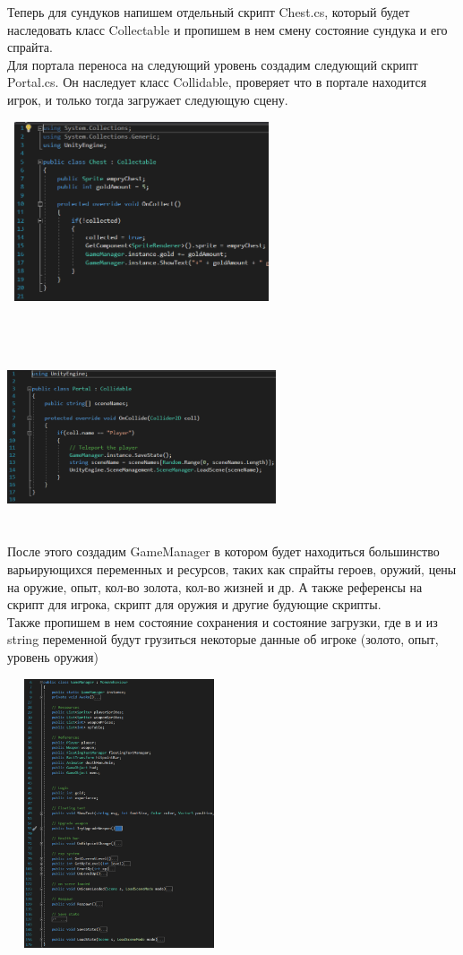\documentclass[a4paper,12pt]{article}
\begin{document}
Теперь для сундуков напишем отдельный скрипт Chest.cs, который будет наследовать класс Collectable и пропишем в нем смену состояние сундука и его спрайта. \\
Для портала переноса на следующий уровень создадим следующий скрипт Portal.cs. Он наследует класс Collidable, проверяет что в портале находится игрок, и только тогда загружает следующую сцену. \\
\centerline{\includegraphics[width = 300px, height=200px]{pictures/chest.png}} \\
\centerline{\includegraphics[width = 300px, height=200px]{pictures/portal.png}}

После этого создадим GameManager в котором будет находиться большинство варьирующихся переменных и ресурсов, таких как спрайты героев, оружий, цены на оружие, опыт, кол-во золота, кол-во жизней и др. А также референсы на скрипт для игрока, скрипт для оружия и другие будующие скрипты. \\
Также пропишем в нем состояние сохранения и состояние загрузки, где в и из string переменной будут грузиться некоторые данные об игроке (золото, опыт, уровень оружия) \\
\centerline{\includegraphics[width = 250px, height=300px]{pictures/gm.png}}
\end{document}
